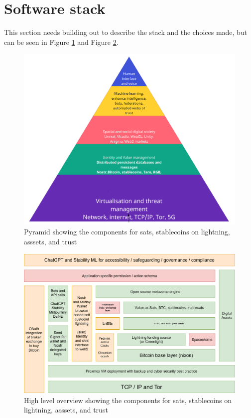 \section{Software stack}
This section needs building out to describe the stack and the choices made, but can be seen in Figure \ref{fig:pyramind} and Figure \ref{fig:highlevelstack}.

\begin{figure}[ht]\centering 	\includegraphics{pyramid}
	\caption{Pyramid showing the components for sats, stablecoins on lightning, asssets, and trust}
	\label{fig:pyramind}
\end{figure}

\begin{figure}[ht]\centering 	\includegraphics{highlevelstack}
	\caption{High level overview showing the components for sats, stablecoins on lightning, asssets, and trust}
	\label{fig:highlevelstack}
\end{figure}

